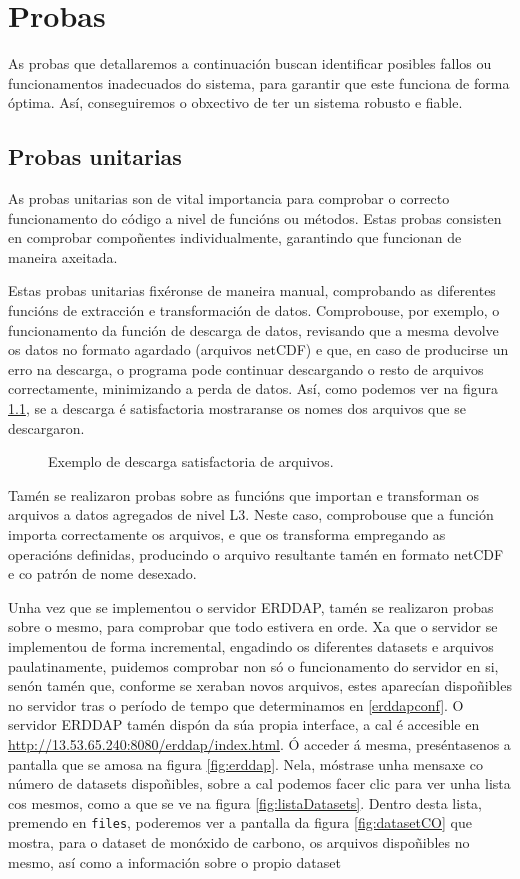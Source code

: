 \chapter{Probas}

As probas que detallaremos a continuación buscan identificar posibles fallos ou funcionamentos inadecuados do sistema, para garantir que este funciona de forma óptima. Así, conseguiremos o
obxectivo de ter un sistema robusto e fiable.

\section{Probas unitarias}\label{unitarias}
As probas unitarias son de vital importancia para comprobar o correcto funcionamento do código a nivel de funcións ou métodos. Estas probas consisten en comprobar compoñentes individualmente,
garantindo que funcionan de maneira axeitada.

Estas probas unitarias fixéronse de maneira manual, comprobando as diferentes funcións de extracción e transformación de datos. Comprobouse, por exemplo, o funcionamento da función de descarga de
datos, revisando que a mesma devolve os datos no formato agardado (arquivos netCDF) e que, en caso de producirse un erro na descarga, o programa pode continuar descargando o resto de arquivos
correctamente, minimizando a perda de datos. Así, como podemos ver na figura \ref{fig:descarga}, se a descarga é satisfactoria mostraranse os nomes dos arquivos que se descargaron.

\begin{figure}
    \caption{Exemplo de descarga satisfactoria de arquivos.}
    \label{fig:descarga}
\end{figure}

Tamén se realizaron probas sobre as funcións que importan e transforman os arquivos a datos agregados de nivel L3. Neste caso, comprobouse que a función importa correctamente os arquivos, e que os
transforma empregando as operacións definidas, producindo o arquivo resultante tamén en formato netCDF e co patrón de nome desexado.

Unha vez que se implementou o servidor ERDDAP, tamén se realizaron probas sobre o mesmo, para comprobar que todo estivera en orde. Xa que o servidor se implementou de forma incremental, engadindo
os diferentes datasets e arquivos paulatinamente, puidemos comprobar non só o funcionamento do servidor en si, senón tamén que, conforme se xeraban novos arquivos, estes aparecían dispoñibles no
servidor tras o período de tempo que determinamos en \ref{erddapconf}. O servidor ERDDAP tamén dispón da súa propia interface, a cal é accesible en \url{http://13.53.65.240:8080/erddap/index.html}.
Ó acceder á mesma, preséntasenos a pantalla que se amosa na figura \ref{fig:erddap}. Nela, móstrase unha mensaxe co número de datasets dispoñibles, sobre a cal podemos facer clic para ver unha lista
cos mesmos, como a que se ve na figura \ref{fig:listaDatasets}. Dentro desta lista, premendo en \texttt{files}, poderemos ver a pantalla da figura \ref{fig:datasetCO} que mostra, para o dataset de
monóxido de carbono, os arquivos dispoñibles no mesmo, así como a información sobre o propio dataset

